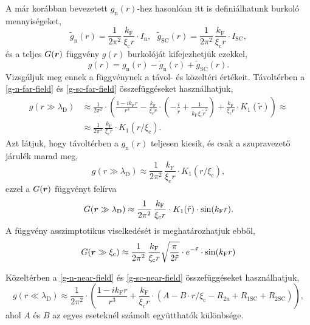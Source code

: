 \documentclass[a4paper,12pt,titlepage]{article}
\newcommand{\RR}{{\vb*{r}}}
\newcommand{\kF}{{k_\text{F}}}
\begin{document}
A már korábban bevezetett $g_\text{n}(r)$-hez hasonlóan itt is definiálhatunk burkoló mennyiségeket,
\begin{equation}
	\tilde{g}_\text{n}(r) = \frac{1}{2 \pi^2} \, \frac{\kF}{\xi_\text{c} r} \cdot I_\text{n}, ~~~
	\tilde{g}_\text{SC}(r) = \frac{1}{2 \pi^2} \, \frac{\kF}{\xi_\text{c} r} \cdot I_\text{SC},
\end{equation}
és a teljes $G(\RR)$ függvény $g(r)$ burkolóját kifejezhetjük ezekkel,
\begin{equation}
	g(r) = g_\text{n}(r) - \tilde{g}_\text{n}(r) + \tilde{g}_\text{SC}(r).
\end{equation}
Vizsgáljuk meg ennek a függvénynek a távol- és közeltéri értékeit.  Távoltérben a \eqref{g-n-far-field} és \eqref{g-sc-far-field} összefüggéseket használhatjuk,
\begin{equation}
\begin{split}
	g(r \gg \lambda_\text{D}) & \approx \frac{1}{2 \pi^2} \cdot \left( \frac{1 - i \kF r}{r^3} - \frac{\kF}{\xi_\text{c} r} \cdot \left( -\frac{i}{\tilde{r}} + \frac{1}{\kF \xi_\text{c} \tilde{r}^2} \right) + \frac{\kF}{\xi_\text{c} r} \cdot K_1(\tilde{r}) \right) \approx \\
	& \approx \frac{1}{2 \pi^2} \, \frac{\kF}{\xi_\text{c} r} \cdot K_1(r / \xi_\text{c}).
\end{split}
\end{equation}
Azt látjuk, hogy távoltérben a $g_\text{n}(r)$ teljesen kiesik, és csak a szupravezető járulék marad meg,
\begin{equation}
	g(r \gg \lambda_\text{D}) \approx \frac{1}{2 \pi^2} \, \frac{\kF}{\xi_\text{c} r} \cdot K_1(r / \xi_\text{c}),
\end{equation}
ezzel a $G(\RR)$ függvényt felírva
\begin{equation}
	G(\RR \gg \lambda_\text{D}) \approx \frac{1}{2 \pi^2} \, \frac{\kF}{\xi_\text{c} r} \cdot K_1(\tilde{r}) \cdot \sin(\kF r).
\end{equation}
A függvény asszimptotikus viselkedését is meghatározhatjuk ebből,
\begin{equation}
	G(\RR \gg \xi_\text{c}) \approx \frac{1}{2 \pi^2} \, \frac{\kF}{\xi_\text{c} r} \sqrt{\frac{\pi}{2 \tilde{r}}} \cdot e^{-\tilde{r}} \cdot \sin(\kF r)
\end{equation}

Közeltérben a \eqref{g-n-near-field} és \eqref{g-sc-near-field} összefüggéseket használhatjuk,
\begin{equation} \label{g-near-field}
	g(r \ll \lambda_\text{D}) \approx \frac{1}{2 \pi^2} \cdot \left( \frac{1 - i \kF r}{r^3} + \frac{\kF}{\xi_\text{c} r} \cdot \left( A - B \cdot r / \xi_\text{c} - R_{2 \text{n}} + R_{1 \text{SC}} + R_{2 \text{SC}} \right) \right),
\end{equation}
ahol $A$ és $B$ az egyes eseteknél számolt együtthatók különbsége.
\end{document}
